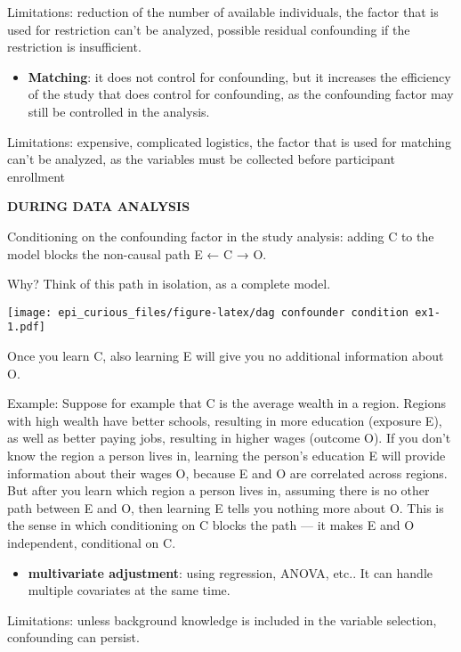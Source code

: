\documentclass[
]{article}
\providecommand{\tightlist}{%
  \setlength{\itemsep}{0pt}\setlength{\parskip}{0pt}}
\begin{document}
Limitations: reduction of the number of available individuals, the
factor that is used for restriction can't be analyzed, possible residual
confounding if the restriction is insufficient.

\begin{itemize}
\tightlist
\item
  \textbf{Matching}: it does not control for confounding, but it
  increases the efficiency of the study that does control for
  confounding, as the confounding factor may still be controlled in the
  analysis.
\end{itemize}

Limitations: expensive, complicated logistics, the factor that is used
for matching can't be analyzed, as the variables must be collected
before participant enrollment

\textbf{DURING DATA ANALYSIS}

Conditioning on the confounding factor in the study analysis: adding C
to the model blocks the non-causal path E ← C → O.

Why? Think of this path in isolation, as a complete model.

\texttt{[image: epi\_curious\_files/figure-latex/dag confounder condition ex1-1.pdf]}

Once you learn C, also learning E will give you no additional
information about O.

Example: Suppose for example that C is the average wealth in a region.
Regions with high wealth have better schools, resulting in more
education (exposure E), as well as better paying jobs, resulting in
higher wages (outcome O). If you don't know the region a person lives
in, learning the person's education E will provide information about
their wages O, because E and O are correlated across regions. But after
you learn which region a person lives in, assuming there is no other
path between E and O, then learning E tells you nothing more about O.
This is the sense in which conditioning on C blocks the path --- it
makes E and O independent, conditional on C.

\begin{itemize}
\tightlist
\item
  \textbf{multivariate adjustment}: using regression, ANOVA, etc.. It
  can handle multiple covariates at the same time.
\end{itemize}

Limitations: unless background knowledge is included in the variable
selection, confounding can persist.
\end{document}
